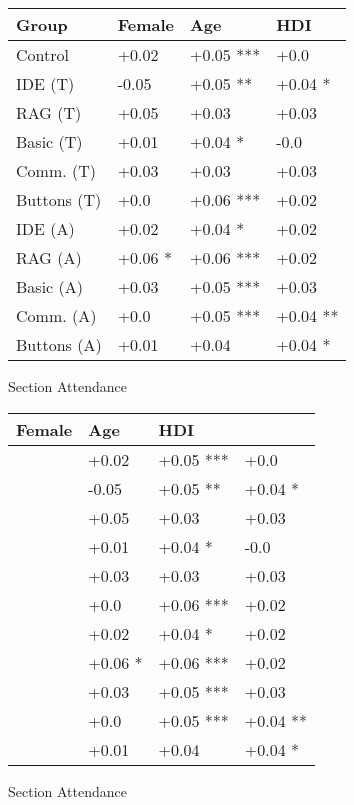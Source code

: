 \centering
\begin{tabular}{llll}
\toprule
Group & Female & Age & HDI \\ \midrule
Control  & +0.02 & +0.05 *** & +0.0\\
IDE (T)  & -0.05 & +0.05 ** & +0.04 *\\
RAG (T)  & +0.05 & +0.03 & +0.03\\
Basic (T)  & +0.01 & +0.04 * & -0.0\\
Comm. (T)  & +0.03 & +0.03 & +0.03\\
Buttons (T)  & +0.0 & +0.06 *** & +0.02\\
IDE (A)  & +0.02 & +0.04 * & +0.02\\
RAG (A)  & +0.06 * & +0.06 *** & +0.02\\
Basic (A)  & +0.03 & +0.05 *** & +0.03\\
Comm. (A)  & +0.0 & +0.05 *** & +0.04 **\\
Buttons (A)  & +0.01 & +0.04 & +0.04 *\\
\bottomrule
\end{tabular}
\caption{Section Attendance}
\label{tab:demo_table}
\centering
\begin{tabular}{lll}
\toprule
Female & Age & HDI \\ \midrule
 & +0.02 & +0.05 *** & +0.0\\
 & -0.05 & +0.05 ** & +0.04 *\\
 & +0.05 & +0.03 & +0.03\\
 & +0.01 & +0.04 * & -0.0\\
 & +0.03 & +0.03 & +0.03\\
 & +0.0 & +0.06 *** & +0.02\\
 & +0.02 & +0.04 * & +0.02\\
 & +0.06 * & +0.06 *** & +0.02\\
 & +0.03 & +0.05 *** & +0.03\\
 & +0.0 & +0.05 *** & +0.04 **\\
 & +0.01 & +0.04 & +0.04 *\\
\bottomrule
\end{tabular}
\caption{Section Attendance}
\label{tab:demo_table}
